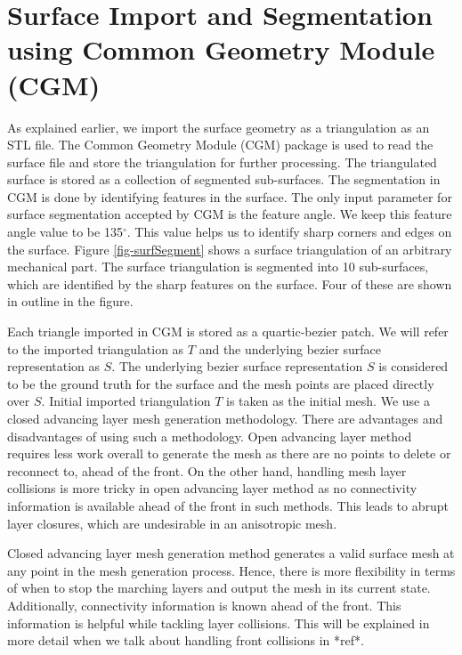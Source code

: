 \section{Surface Import and Segmentation using Common Geometry Module (CGM)}

As explained earlier, we import the surface geometry as a triangulation as an STL file. The Common Geometry Module (CGM) package is used to read the surface file and store the triangulation for further processing. The triangulated surface is stored as a collection of segmented sub-surfaces. The segmentation in CGM is done by identifying features in the surface. The only input parameter for surface segmentation accepted by CGM is the feature angle. We keep this feature angle value to be 135{$^\circ{}$}. This value helps us to identify sharp corners and edges on the surface. Figure \ref{fig-surfSegment} shows a surface triangulation of an arbitrary mechanical part. The surface triangulation is segmented into 10 sub-surfaces, which are identified by the sharp features on the surface. Four of these are shown in outline in the figure.

Each triangle imported in CGM is stored as a quartic-bezier patch. We will refer to the imported triangulation as $T$ and the underlying bezier surface representation as $S$. The underlying bezier surface representation $S$ is considered to be the ground truth for the surface and the mesh points are placed directly over $S$. Initial imported triangulation $T$ is taken as the initial mesh. We use a closed advancing layer mesh generation methodology. There are advantages and disadvantages of using such a methodology. Open advancing layer method requires less work overall to generate the mesh as there are no points to delete or reconnect to, ahead of the front. On the other hand, handling mesh layer collisions is  more tricky in open advancing layer method as no connectivity information is available ahead of the front in such methods. This leads to abrupt layer closures, which are undesirable in an anisotropic mesh.

Closed advancing layer mesh generation method generates a valid surface mesh at any point in the mesh generation process. Hence, there is more flexibility in terms of when to stop the marching layers and output the mesh in its current state. Additionally, connectivity information is known ahead of the front. This information is helpful while tackling layer collisions. This will be explained in more detail when we talk about handling front collisions in *ref*.

